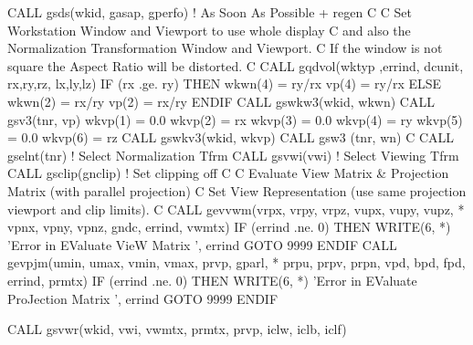 \begin{XMP}
      CALL gsds(wkid, gasap, gperfo)  ! As Soon As Possible + regen
C
C     Set Workstation Window and Viewport to use whole display
C     and also the Normalization Transformation Window and Viewport.
C     If the window is not square the Aspect Ratio will be distorted.
C
      CALL gqdvol(wktyp ,errind, dcunit, rx,ry,rz, lx,ly,lz)
      IF (rx .ge. ry) THEN
        wkwn(4) = ry/rx
        vp(4) = ry/rx
      ELSE
        wkwn(2) = rx/ry
        vp(2) = rx/ry
      ENDIF
      CALL gswkw3(wkid, wkwn)
      CALL gsv3(tnr,  vp)
      wkvp(1) = 0.0
      wkvp(2) = rx
      wkvp(3) = 0.0
      wkvp(4) = ry
      wkvp(5) = 0.0
      wkvp(6) = rz
      CALL gswkv3(wkid,  wkvp)
      CALL gsw3 (tnr, wn)
C
      CALL gselnt(tnr)                ! Select Normalization Tfrm
      CALL gsvwi(vwi)                 ! Select Viewing Tfrm
      CALL gsclip(gnclip)             ! Set clipping off
C
C     Evaluate View Matrix & Projection Matrix (with parallel projection)
C     Set View Representation (use same projection viewport and clip limits).
C
      CALL gevvwm(vrpx, vrpy, vrpz, vupx, vupy, vupz,
     *            vpnx, vpny, vpnz, gndc, errind, vwmtx)
      IF (errind .ne. 0) THEN
         WRITE(6, *) 'Error in EValuate VieW Matrix ', errind
         GOTO 9999
      ENDIF
      CALL gevpjm(umin, umax, vmin, vmax, prvp, gparl,
     *            prpu, prpv, prpn, vpd,  bpd,  fpd, errind, prmtx)
      IF (errind .ne. 0) THEN
         WRITE(6, *) 'Error in EValuate ProJection Matrix ', errind
         GOTO 9999
      ENDIF
 
      CALL gsvwr(wkid, vwi,  vwmtx, prmtx, prvp, iclw, iclb, iclf)
 

\end{XMP}
